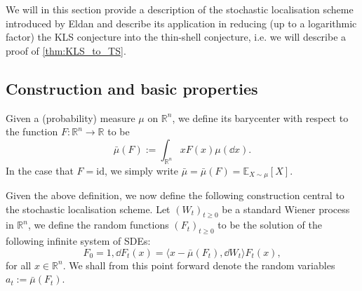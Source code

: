 We will in this section provide a description of the stochastic localisation scheme introduced by 
Eldan \cite{Eldan_2013} and describe its application in reducing (up to a logarithmic factor) the 
KLS conjecture into the thin-shell conjecture, i.e. we will describe a proof of \ref{thm:KLS_to_TS}.


\subsection{Construction and basic properties}\label{sec:construct}

\begin{definition}[Barycenter]
  Given a (probability) measure \(\mu\) on \(\mathbb{R}^n\), we define 
  its barycenter with respect to the function \(F : \mathbb{R}^n \to \mathbb{R}\) to be
  \[\bar{\mu}(F) := \int_{\mathbb{R}^n} x F(x) \mu(\dd x).\]
  In the case that \(F = \text{id}\), we simply write \(\bar{\mu} = \bar{\mu}(F) = \mathbb{E}_{X \sim \mu}[X]\).
\end{definition}

Given the above definition, we now define the following construction central to the stochastic 
localisation scheme. Let \((W_t)_{t \ge 0}\) be a standard Wiener process in \(\mathbb{R}^n\), we define the random functions 
\((F_t)_{t \ge 0}\) to be the solution of the following infinite system of SDEs: 
\begin{equation}\label{eq:stoch_loc}
  F_0 = 1, \dd F_t(x) = \langle x - \bar{\mu}(F_t), \dd W_t \rangle F_t(x),
\end{equation}
for all \(x \in \mathbb{R}^n\). We shall from this point forward denote the random variables 
\(a_t := \bar{\mu}(F_t)\).


